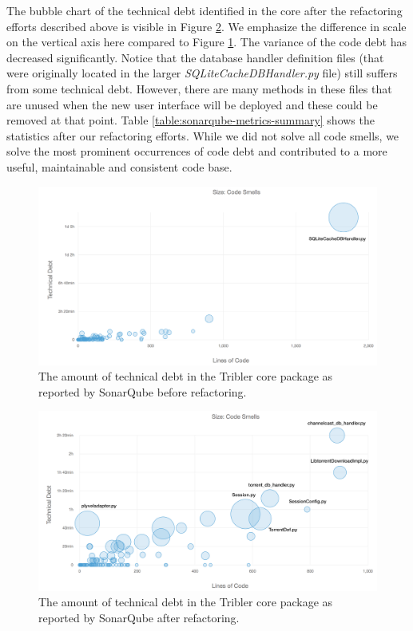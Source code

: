 The bubble chart of the technical debt identified in the core after the refactoring efforts described above is visible in Figure \ref{fig:technical-debt-core-after}. We emphasize the difference in scale on the vertical axis here compared to Figure \ref{fig:technical-debt-core-before}. The variance of the code debt has decreased significantly. Notice that the database handler definition files (that were originally located in the larger \emph{SQLiteCacheDBHandler.py} file) still suffers from some technical debt. However, there are many methods in these files that are unused when the new user interface will be deployed and these could be removed at that point. Table \ref{table:sonarqube-metrics-summary} shows the statistics after our refactoring efforts. While we did not solve all code smells, we solve the most prominent occurrences of code debt and contributed to a more useful, maintainable and consistent code base.

\begin{figure}[h!]
	\centering
	\includegraphics[width=1.0\columnwidth]{images/improving_qa/technical_debt_core_before}
	\caption{The amount of technical debt in the Tribler core package as reported by SonarQube before refactoring.}
	\label{fig:technical-debt-core-before}
\end{figure}

\begin{figure}[h!]
	\centering
	\includegraphics[width=1.0\columnwidth]{images/improving_qa/technical_debt_core_after}
	\caption{The amount of technical debt in the Tribler core package as reported by SonarQube after refactoring.}
	\label{fig:technical-debt-core-after}
\end{figure}

